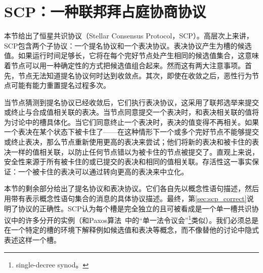 \section{SCP：一种联邦拜占庭协商协议}\label{sec:scp}

本节给出了恒星共识协议（Stellar Consensus Protocol，SCP）。高层次上来讲，SCP包含两个子协议：一个提名协议和一个表决协议。表决协议产生为槽的候选值。如果运行时间足够长，它将在每个完好节点处产生相同的候选值集合，这意味着节点可以用一种确定性的方式把候选值组合起来。然而这有两大注意事项。首先，节点无法知道提名协议何时达到收敛点。其次，即使在收敛之后，恶性行为节点可能有能力重置提名过程多次。

当节点猜测到提名协议已经收敛后，它们执行表决协议，这采用了联邦选举来提交或终止与合成值相关联的表决。当节点同意提交一个表决时，和表决相关联的值将为讨论中的槽具体化。当它们同意终止一个表决时，表决的值变得不再相关。如果一个表决在某个状态下被卡住了——在这种情形下一个或多个完好节点不能够提交或终止表决，那么节点重新使用更高的表决来尝试；他们将新的表决和被卡住的表决一样的值相关联，以防止任何节点错以为被卡住的节点被提交了。直观上来说，安全性来源于所有被卡住的或已提交的表决和相同的值相关联。存活性这一事实保证：一个被卡住的表决可以通过转向更高的表决来中立化。

本节的剩余部分给出了提名协议和表决协议。它们各自先以概念性语句描述，然后用带有表示概念性语句集合的消息的具体协议描述。最终，第\ref{sec:scp_correct}说明了协议的正确性。SCP认为每个槽是完全独立的且可被看成是一个单一槽共识协议中的许多分开的实例（和Paxos算法~\cite{Lamport:1998:PP:279227.279229}中的``单一法令议会''\footnote{single-decree synod。}类似）。我们必须总是在一个特定的槽的环境下解释例如候选值和表决等概念，而不像替他的讨论中隐式表述这样一个槽。



